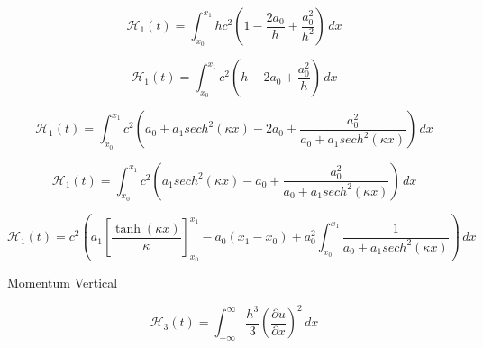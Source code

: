 \documentclass[12pt]{article}
\begin{document}
\[\mathcal{H}_1 (t) = \int_{x_0}^{x_1} hc^2\left(1 -\frac{2a_0}{h}  + \frac{a_0^2}{h^2}\right) \, dx\]

\[\mathcal{H}_1 (t) = \int_{x_0}^{x_1} c^2\left(h -2a_0 + \frac{a_0^2}{h}\right) \, dx\]

\[\mathcal{H}_1 (t) = \int_{x_0}^{x_1} c^2\left(a_0 + a_1 sech^2\left(\kappa x\right) - 2a_0  + \frac{a_0^2}{a_0 + a_1 sech^2\left(\kappa x\right)}\right) \, dx\]

\[\mathcal{H}_1 (t) = \int_{x_0}^{x_1} c^2\left(a_1 sech^2\left(\kappa x\right) - a_0  + \frac{a_0^2}{a_0 + a_1 sech^2\left(\kappa x\right)}\right) \, dx\]

\[\mathcal{H}_1 (t) = c^2\left(a_1 \left[\frac{\tanh\left(\kappa x\right)}{\kappa}\right]_{x_0}^{x_1} - a_0(x_1 - x_0)  + a_0^2\int_{x_0}^{x_1}\frac{1}{a_0 + a_1 sech^2\left(\kappa x\right)}\right) \, dx\]

Momentum Vertical

\[\mathcal{H}_3 (t) = \int_{-\infty}^{\infty}\frac{h^3}{3} \left(\frac{\partial u}{\partial x}\right)^2\, dx\]
\end{document}

